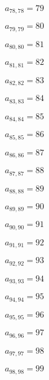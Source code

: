 \documentclass[a4paper,12pt]{article}
\begin{document}
$a _{ 78, 78 } = 79$

$a _{ 79, 79 } = 80$

$a _{ 80, 80 } = 81$

$a _{ 81, 81 } = 82$

$a _{ 82, 82 } = 83$

$a _{ 83, 83 } = 84$

$a _{ 84, 84 } = 85$

$a _{ 85, 85 } = 86$

$a _{ 86, 86 } = 87$

$a _{ 87, 87 } = 88$

$a _{ 88, 88 } = 89$

$a _{ 89, 89 } = 90$

$a _{ 90, 90 } = 91$

$a _{ 91, 91 } = 92$

$a _{ 92, 92 } = 93$

$a _{ 93, 93 } = 94$

$a _{ 94, 94 } = 95$

$a _{ 95, 95 } = 96$

$a _{ 96, 96 } = 97$

$a _{ 97, 97 } = 98$

$a _{ 98, 98 } = 99$
\end{document}
